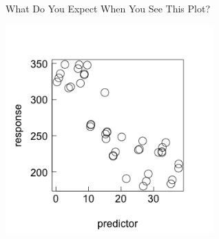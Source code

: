\documentclass{beamer}
\begin{document}
\begin{frame}{What Do You Expect When You See This Plot?}
  \begin{center}
    \includegraphics[width=0.6\textwidth]{lectures/day_1_intro_to_mems/figures/unnamed-chunk-8-1.png} %
  \end{center}
\end{frame}
\end{document}
